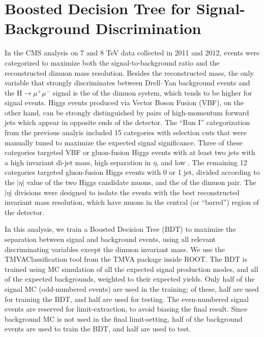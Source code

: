 \section{Boosted Decision Tree for Signal-Background Discrimination}
\label{bdt_training}

In the CMS analysis on 7 and 8 TeV data collected in 2011 and 2012, events were
categorized to maximize both the signal-to-background ratio and the reconstructed
dimuon mass resolution.  Besides the reconstructed mass, the only variable that
strongly discriminates between Drell--Yan background events and the
H$\rightarrow\mu^{+}\mu^{-}$ signal is the \pt of the dimuon system, which tends
to be higher for signal events.  Higgs events produced via Vector Boson Fusion
(VBF), on the other hand, can be strongly distinguished by pairs of high-momentum
forward jets which appear in opposite ends of the detector.  The ``Run I''
categorization from the previous analyis included 15 categories with selection
cuts that were manually tuned to maximize the expected signal significance.
Three of these categories targeted VBF or gluon-fusion Higgs events with at least
two jets with a high invariant di-jet mass, high separation in $\eta$, and low \MET.
The remaining 12 categories targeted gluon-fusion Higgs events with 0 or 1 jet,
divided according to the $|\eta|$ value of the two Higgs candidate muons, and
the \pt of the dimuon pair.  The $|\eta|$ divisions were designed to isolate the
events with the best reconstructed invariant mass resolution, which have
muons in the central (or ``barrel'') region of the detector.

In this analysis, we train a Boosted Decision Tree (BDT) to maximize the separation
between signal and background events, using all relevant discriminating variables
except the dimuon invariant mass.  We use the TMVAClassification tool from the TMVA
package inside ROOT.  The BDT is trained using MC simulation of
all the expected signal production modes, and all of the expected backgrounds,
weighted to their expected yields.  Only half of the signal MC (odd-numbered events)
are used in the training; of these, half are used for training the BDT, and half
are used for testing.  The even-numbered signal events are reserved for
limit-extraction, to avoid biasing the final result.  Since background MC is not
used in the final limit-setting, half of the background events are used to train
the BDT, and half are used to test.

